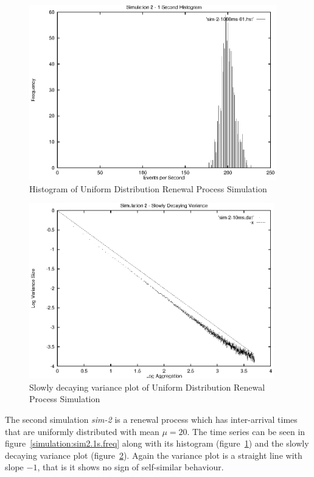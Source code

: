 \begin{figure}
\includegraphics[height=3in]{pics/sim-2-1s-hist-01.eps}
\caption{Histogram of Uniform Distribution Renewal Process Simulation}
\label{simulation:sim2.1s.hist}
\end{figure}

\begin{figure}
\includegraphics[height=3in]{pics/sim-2-10ms-sta.eps}
\caption{Slowly decaying variance plot of Uniform Distribution Renewal Process Simulation}
\label{simulation:sim2.10ms.sta}
\end{figure}

The second simulation \emph{sim-2} is a renewal process which has
inter-arrival times that are uniformly distributed with mean $\mu =
20$.  The time series can be seen in
figure~\ref{simulation:sim2.1s.freq} along with its histogram
(figure~\ref{simulation:sim2.1s.hist}) and the slowly decaying
variance plot (figure~\ref{simulation:sim2.10ms.sta}).  Again the
variance plot is a straight line with slope $-1$, that is it shows no
sign of self-similar behaviour.

